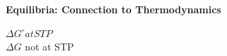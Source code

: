 \begin{minipage}{0.69\linewidth}
\textbf{Equilibria: Connection to Thermodynamics}\\
\end{minipage}
\begin{minipage}{0.3\linewidth}
$\Delta G^{\circ} at STP$\\
$\Delta G$ not at STP
\end{minipage}
